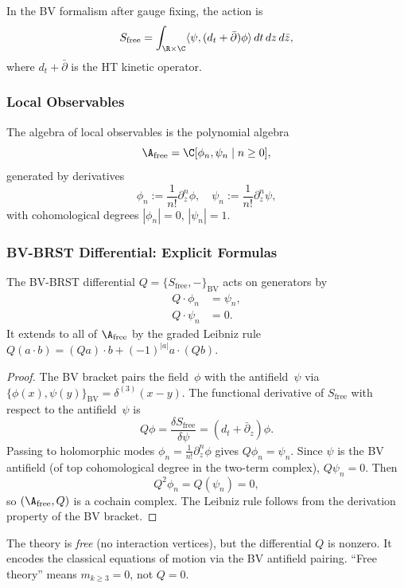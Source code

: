In the BV formalism after gauge fixing, the action is
\[
S_{\text{free}} = \int_{\R \times \C} \langle \psi, (d_t + \bar{\partial})\phi \rangle \, dt \, dz \, d\bar{z},
\]
where $d_t + \bar{\partial}$ is the HT kinetic operator.

\subsubsection{Local Observables}

The algebra of local observables is the polynomial algebra
\[
\A_{\text{free}} = \C[\phi_n, \psi_n \mid n \geq 0],
\]
generated by derivatives
\[
\phi_n := \frac{1}{n!} \partial_z^n \phi, \quad \psi_n := \frac{1}{n!} \partial_z^n \psi,
\]
with cohomological degrees $|\phi_n| = 0$, $|\psi_n| = 1$.

\subsubsection{BV-BRST Differential: Explicit Formulas}

\begin{proposition}
\label{prop:free_BRST_detailed}
The BV-BRST differential $Q = \{S_{\text{free}}, -\}_{\mathrm{BV}}$ acts on generators by
\begin{align}
Q \cdot \phi_n &= \psi_n, \label{eq:Qphi_free}\\
Q \cdot \psi_n &= 0. \label{eq:Qpsi_free}
\end{align}
It extends to all of $\A_{\text{free}}$ by the graded Leibniz rule $Q(a\cdot b) = (Qa)\cdot b + (-1)^{|a|}a\cdot (Qb)$.
\end{proposition}

\begin{proof}
The BV bracket pairs the field~$\phi$ with the antifield~$\psi$ via $\{\phi(x),\psi(y)\}_{\mathrm{BV}} = \delta^{(3)}(x-y)$. The functional derivative of $S_{\text{free}}$ with respect to the antifield~$\psi$ is
\[
Q\phi = \frac{\delta S_{\text{free}}}{\delta \psi} = (d_t + \bar{\partial}_z)\phi.
\]
Passing to holomorphic modes $\phi_n = \frac{1}{n!}\partial_z^n\phi$ gives $Q\phi_n = \psi_n$. Since $\psi$ is the BV antifield (of top cohomological degree in the two-term complex), $Q\psi_n = 0$. Then
\[
Q^2\phi_n = Q(\psi_n) = 0,
\]
so $(\A_{\text{free}}, Q)$ is a cochain complex. The Leibniz rule follows from the derivation property of the BV bracket.
\end{proof}

\begin{remark}
The theory is \emph{free} (no interaction vertices), but the differential $Q$ is nonzero. It encodes the classical equations of motion via the BV antifield pairing. ``Free theory'' means $m_{k\ge 3}=0$, not $Q=0$.
\end{remark}

